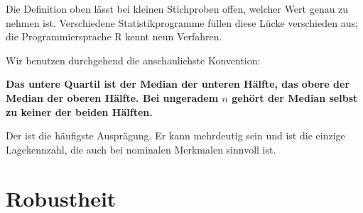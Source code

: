 \begin{warnung}
Die Definition oben lässt bei kleinen Stichproben offen, welcher Wert genau zu nehmen ist. Verschiedene Statistikprogramme füllen diese Lücke verschieden aus; die Programmiersprache R kennt neun Verfahren.

Wir benutzen durchgehend die anschaulichste Konvention:

\begin{center}
\begin{minipage}{0.9\textwidth}
\textbf{Das untere Quartil ist der Median der unteren Hälfte, das obere der Median der oberen Hälfte. Bei ungeradem $n$ gehört der Median selbst zu keiner der beiden Hälften.}
\end{minipage}
\end{center}

\begin{center}
\begin{minipage}{0.88\textwidth}
\end{minipage}
\end{center}
\end{warnung}

\begin{definition}
Der  ist die häufigste Ausprägung. Er kann mehrdeutig sein und ist die einzige Lagekennzahl, die auch bei nominalen Merkmalen sinnvoll ist.
\end{definition}

\section{Robustheit}

